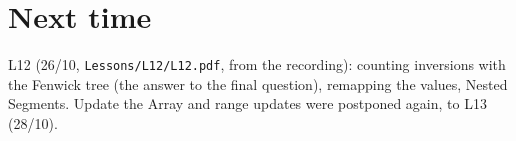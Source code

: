 \documentclass[11pt,a4paper]{article}
\theoremstyle{definition}\newtheorem*{definition}{Definition}
\begin{document}
\section{Next time}
L12 (26/10, \texttt{Lessons/L12/L12.pdf}, from the recording): counting inversions with the Fenwick tree (the answer to the final question), remapping the values,
Nested Segments. Update the Array and range updates were postponed again, to L13 (28/10).
\end{document}
